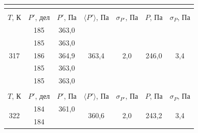\documentclass[a4paper,12pt]{article} %
\begin{document}
\begin{table}[H]
\begin{tabular}{ccccccc}
		\multicolumn{1}{c|}{} \\ \hline
		&
		&
		&
		&
		&
		&
		\\ \hline
		\multicolumn{1}{|c|}{$ T $, К} &
		\multicolumn{1}{c|}{$ P' $, дел} &
		\multicolumn{1}{c|}{$ P' $, Па} &
		\multicolumn{1}{c|}{$ \langle P' \rangle $, Па} &
		\multicolumn{1}{c|}{$ \sigma_{P'} $, Па} &
		\multicolumn{1}{c|}{$ P $, Па} &
		\multicolumn{1}{c|}{$ \sigma_P $, Па} \\ \hline
		\multicolumn{1}{|c|}{\multirow{5}{*}{317}} &
		\multicolumn{1}{c|}{185} &
		\multicolumn{1}{c|}{363,0} &
		\multicolumn{1}{c|}{\multirow{5}{*}{363,4}} &
		\multicolumn{1}{c|}{\multirow{5}{*}{2,0}} &
		\multicolumn{1}{c|}{\multirow{5}{*}{246,0}} &
		\multicolumn{1}{c|}{\multirow{5}{*}{3,4}} \\ \cline{2-3}
		\multicolumn{1}{|c|}{} &
		\multicolumn{1}{c|}{185} &
		\multicolumn{1}{c|}{363,0} &
		\multicolumn{1}{c|}{} &
		\multicolumn{1}{c|}{} &
		\multicolumn{1}{c|}{} &
		\multicolumn{1}{c|}{} \\ \cline{2-3}
		\multicolumn{1}{|c|}{} &
		\multicolumn{1}{c|}{186} &
		\multicolumn{1}{c|}{364,9} &
		\multicolumn{1}{c|}{} &
		\multicolumn{1}{c|}{} &
		\multicolumn{1}{c|}{} &
		\multicolumn{1}{c|}{} \\ \cline{2-3}
		\multicolumn{1}{|c|}{} &
		\multicolumn{1}{c|}{185} &
		\multicolumn{1}{c|}{363,0} &
		\multicolumn{1}{c|}{} &
		\multicolumn{1}{c|}{} &
		\multicolumn{1}{c|}{} &
		\multicolumn{1}{c|}{} \\ \cline{2-3}
		\multicolumn{1}{|c|}{} &
		\multicolumn{1}{c|}{185} &
		\multicolumn{1}{c|}{363,0} &
		\multicolumn{1}{c|}{} &
		\multicolumn{1}{c|}{} &
		\multicolumn{1}{c|}{} &
		\multicolumn{1}{c|}{} \\ \hline
		&
		&
		&
		&
		&
		&
		\\ \hline
		\multicolumn{1}{|c|}{$ T $, К} &
		\multicolumn{1}{c|}{$ P' $, дел} &
		\multicolumn{1}{c|}{$ P' $, Па} &
		\multicolumn{1}{c|}{$ \langle P' \rangle $, Па} &
		\multicolumn{1}{c|}{$ \sigma_{P'} $, Па} &
		\multicolumn{1}{c|}{$ P $, Па} &
		\multicolumn{1}{c|}{$ \sigma_P $, Па} \\ \hline
		\multicolumn{1}{|c|}{\multirow{5}{*}{322}} &
		\multicolumn{1}{c|}{184} &
		\multicolumn{1}{c|}{361,0} &
		\multicolumn{1}{c|}{\multirow{5}{*}{360,6}} &
		\multicolumn{1}{c|}{\multirow{5}{*}{2,0}} &
		\multicolumn{1}{c|}{\multirow{5}{*}{243,2}} &
		\multicolumn{1}{c|}{\multirow{5}{*}{3,4}} \\ \cline{2-3}
		\multicolumn{1}{|c|}{} &
		\multicolumn{1}{c|}{184} &

\end{tabular}
\end{table}
\end{document}

